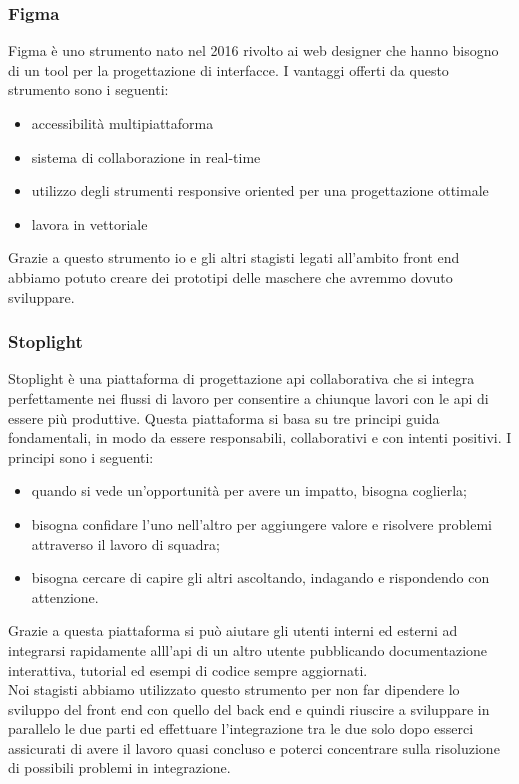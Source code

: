 \subsubsection{Figma}

Figma è uno strumento nato nel 2016 rivolto ai web designer che hanno bisogno di un tool per la progettazione di interfacce. I vantaggi offerti da questo strumento sono i seguenti:
\begin{itemize}
	\item accessibilità multipiattaforma
	\item sistema di collaborazione in real-time
	\item utilizzo degli strumenti responsive oriented per una progettazione ottimale
	\item lavora in vettoriale
\end{itemize}
Grazie a questo strumento io e gli altri stagisti legati all'ambito front end abbiamo potuto creare dei prototipi delle maschere che avremmo dovuto sviluppare.

\subsubsection{Stoplight}

Stoplight è una piattaforma di progettazione \gls{api} collaborativa che si integra perfettamente nei flussi di lavoro per consentire a chiunque lavori con le \gls{api} di essere più produttive. Questa piattaforma si basa su tre principi guida fondamentali, in modo da essere responsabili, collaborativi e con intenti positivi. I principi sono i seguenti:
\begin{itemize}
	\item quando si vede un'opportunità per avere un impatto, bisogna coglierla;
	\item bisogna confidare l'uno nell'altro per aggiungere valore e risolvere problemi attraverso il lavoro di squadra;
	\item bisogna cercare di capire gli altri ascoltando, indagando e rispondendo con attenzione.
\end{itemize}
Grazie a questa piattaforma si può aiutare gli utenti interni ed esterni ad integrarsi rapidamente alll'\gls{api} di un altro utente pubblicando documentazione interattiva, tutorial ed esempi di codice sempre aggiornati.\\
Noi stagisti abbiamo utilizzato questo strumento per non far dipendere lo sviluppo del front end con quello del back end e quindi riuscire a sviluppare in parallelo le due parti ed effettuare l'integrazione tra le due solo dopo esserci assicurati di avere il lavoro quasi concluso e poterci concentrare sulla risoluzione di possibili problemi in integrazione.

